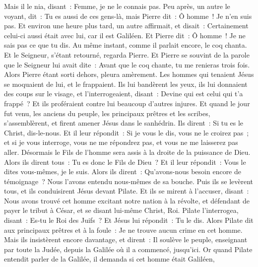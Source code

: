 \begin{multicols}{2}
Mais il le nia, disant~: Femme, je ne le connais pas.
Peu après, un autre le voyant, dit~: Tu es aussi de ces gens-là, mais Pierre dit~: Ô homme~! Je n'en suis pas.
Et environ une heure plus tard, un autre affirmait, et disait~: Certainement celui-ci aussi était avec lui, car il est Galiléen.
Et Pierre dit~: Ô homme~! Je ne sais pas ce que tu dis. Au même instant, comme il parlait encore, le coq chanta.
Et le Seigneur, s'étant retourné, regarda Pierre. Et Pierre se souvint de la parole que le Seigneur lui avait dite~: Avant que le coq chante, tu me renieras trois fois.
Alors Pierre étant sorti dehors, pleura amèrement.
Les hommes qui tenaient Jésus se moquaient de lui, et le frappaient.
Ils lui bandèrent les yeux, ils lui donnaient des coups sur le visage, et l'interrogeaient, disant~: Devine qui est celui qui t'a frappé~?
Et ils proféraient contre lui beaucoup d'autres injures.
Et quand le jour fut venu, les anciens du peuple, les principaux prêtres et les scribes, s'assemblèrent, et firent amener Jésus dans le sanhédrin.
Ils dirent~: Si tu es le Christ, dis-le-nous. Et il leur répondit~: Si je vous le dis, vous ne le croirez pas~;
et si je vous interroge, vous ne me répondrez pas, et vous ne me laisserez pas aller.
Désormais le Fils de l'homme sera assis à la droite de la puissance de Dieu.
Alors ils dirent tous~: Tu es donc le Fils de Dieu~? Et il leur répondit~: Vous le dites vous-mêmes, je le suis.
Alors ils dirent~: Qu'avons-nous besoin encore de témoignage~? Nous l'avons entendu nous-mêmes de sa bouche.
\VerseOne{}Puis ils se levèrent tous, et ils conduisirent Jésus devant Pilate.
Et ils se mirent à l'accuser, disant~: Nous avons trouvé cet homme excitant notre nation à la révolte, et défendant de payer le tribut à César, et se disant lui-même Christ, Roi.
Pilate l'interrogea, disant~: Es-tu le Roi des Juifs~? Et Jésus lui répondit~: Tu le dis.
Alors Pilate dit aux principaux prêtres et à la foule~: Je ne trouve aucun crime en cet homme.
Mais ils insistèrent encore davantage, et dirent~: Il soulève le peuple, enseignant par toute la Judée, depuis la Galilée où il a commencé, jusqu'ici.
Or quand Pilate entendit parler de la Galilée, il demanda si cet homme était Galiléen,

\end{multicols}
